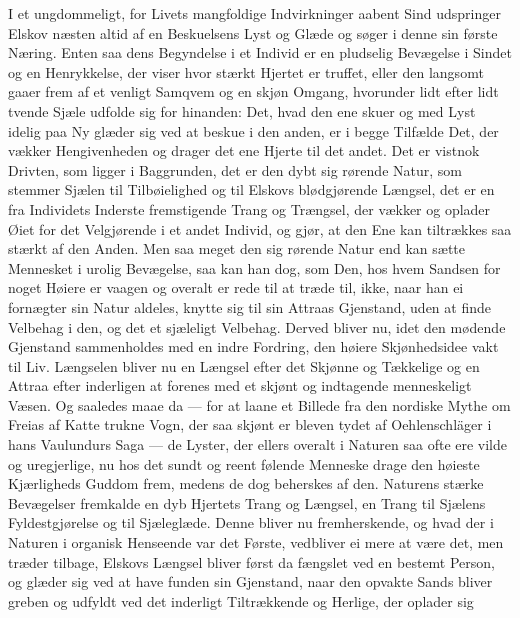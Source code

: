 \documentclass[12pt,a4paper]{book}
\newcommand{\apage}[1]{\marginnote{\footnotesize\textit{[#1]}}}
\begin{document}
I et ungdommeligt, for Livets mangfoldige Indvirkninger aabent Sind
udspringer Elskov næsten altid af en Beskuelsens Lyst og Glæde og søger
i denne sin første Næring. Enten saa dens Begyndelse i et Individ er en
pludselig Bevægelse i Sindet og en Henrykkelse, der viser hvor stærkt
Hjertet er truffet, eller den langsomt gaaer frem af et venligt Samqvem
og en skjøn Omgang, hvorunder lidt efter lidt tvende Sjæle udfolde sig
for hinanden: Det, hvad den ene skuer og med Lyst idelig paa Ny glæder
sig ved at beskue i den anden, er i begge Tilfælde Det, der vækker
Hengivenheden og drager det ene Hjerte til det andet. Det er vistnok
Drivten, som ligger i Baggrunden, det er den dybt sig rørende Natur,
som stemmer Sjælen til Tilbøielighed og til Elskovs blødgjørende
Længsel, det er en fra Individets Inderste fremstigende Trang og
Trængsel, der vækker og oplader Øiet for det Velgjørende i et andet
Individ, og gjør, at den Ene kan tiltrækkes saa stærkt af den Anden.
Men saa meget den sig rørende Natur end kan sætte Mennesket i urolig
Bevægelse, saa kan han dog, som Den, hos hvem Sandsen for noget Høiere
er vaagen og overalt er rede til \apage{5} at træde til, ikke, naar han ei
fornægter sin Natur aldeles, knytte sig til sin Attraas Gjenstand, uden
at finde Velbehag i den, og det et sjæleligt Velbehag. Derved bliver
nu, idet den mødende Gjenstand sammenholdes med en indre Fordring, den
høiere Skjønhedsidee vakt til Liv. Længselen bliver nu en Længsel efter
det Skjønne og Tækkelige og en Attraa efter inderligen at forenes med
et skjønt og indtagende menneskeligt Væsen. Og saaledes maae da --- for
at laane et Billede fra den nordiske Mythe om Freias af Katte trukne
Vogn, der saa skjønt er bleven tydet af Oehlenschläger i hans Vaulundurs
Saga --- de Lyster, der ellers overalt i Naturen saa ofte ere vilde og
uregjerlige, nu hos det sundt og reent følende Menneske drage den
høieste Kjærligheds Guddom frem, medens de dog beherskes af den.
Naturens stærke Bevægelser fremkalde en dyb Hjertets Trang og Længsel,
en Trang til Sjælens Fyldestgjørelse og til Sjæleglæde. Denne bliver nu
fremherskende, og hvad der i Naturen i organisk Henseende var det
Første, vedbliver ei mere at være det, men træder tilbage, Elskovs
Længsel bliver først da fængslet ved en bestemt Person, og glæder sig
ved at have funden sin Gjenstand, naar den opvakte Sands bliver greben
og udfyldt ved det inderligt Tiltrækkende og Herlige, der oplader sig
\end{document}
